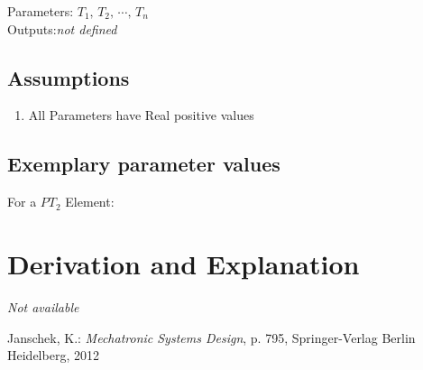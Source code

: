 \documentclass[10pt,a4paper]{article}
\begin{document}
	
	\noindent
	Parameters: $T_1, \, T_2, \, \cdots, \, T_n$ %
	\\
	Outputs:\textit{\textlangle not defined\textrangle}
	
	\subsection{Assumptions} %
	\begin{enumerate} %
		\item All Parameters have Real positive values
	\end{enumerate}
	
	
	\subsection{Exemplary parameter values}
	For a $PT_2$ Element:\\
	

	
	\section{Derivation and Explanation} %
	
	\textit{Not available}
	
	
	\begin{thebibliography}{10}		
		Janschek, K.: 
		\textit{Mechatronic Systems Design}, p. 795, Springer-Verlag Berlin Heidelberg, 2012
	\end{thebibliography}
\end{document}

